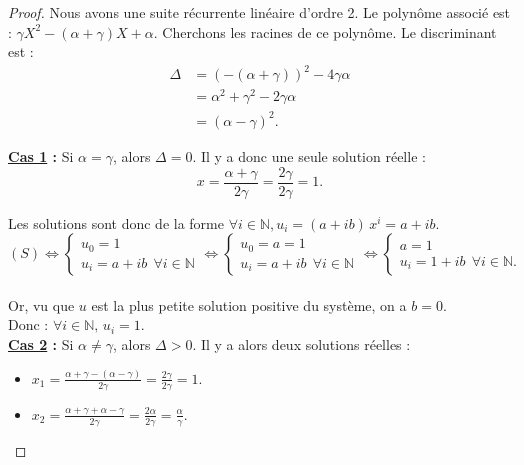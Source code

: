 \documentclass[12pt,a4paper]{report}
\theoremstyle{remark}
\begin{document}
\begin{proof}
\vspace{0.5cm}

Nous avons une suite récurrente linéaire d'ordre 2. Le polynôme associé est  : $\gamma X^2 -(\alpha+\gamma)X+\alpha$. Cherchons les racines de ce polynôme. Le discriminant est :
\begin{align*}
\Delta &= (-(\alpha+\gamma))^2 - 4\gamma \alpha \\
&=\alpha^2 + \gamma^2-2\gamma\alpha \\
&= (\alpha-\gamma)^2.
\end{align*}

\textbf{\underline{Cas 1} :} Si $\alpha = \gamma$, alors $\Delta = 0$. Il y a donc une seule solution réelle :
$$x = \frac{\alpha + \gamma}{2 \gamma}=  \frac{2\gamma}{2\gamma} = 1.$$

Les solutions sont donc de la forme $\forall i \in \mathbb{N}, u_i = (a+ib) \, x^i = a+ib$.\\
$$(S) \iff \left\{
\begin{array}{ll}
        u_0=1\\
        u_i=a+ib \ \ \forall i \in \mathbb{N}
    \end{array}
\right.
\iff \left\{
\begin{array}{ll}
        u_0=a=1\\
        u_i=a+ib \ \ \forall i \in \mathbb{N}
    \end{array}
    \right.
\iff \left\{
\begin{array}{ll}
        a = 1\\
        u_i=1+ib \ \ \forall i \in \mathbb{N}.
    \end{array}
    \right.$$
\\
Or, vu que $u$ est la plus petite solution positive du système, on a $b=0$.\\
Donc : $\forall i \in \mathbb{N}, \, u_i=1.$
\vspace{0.7cm}\\
\textbf{\underline{Cas 2} :} Si $\alpha \neq \gamma$, alors $\Delta > 0$. Il y a alors deux solutions réelles :
\\
\begin{itemize}
\item $x_1 = \frac{\alpha + \gamma - (\alpha-\gamma)}{2\gamma}=\frac{2\gamma}{2\gamma}=1.$
\item $x_2= \frac{\alpha + \gamma + \alpha-\gamma}{2\gamma}=\frac{2\alpha}{2\gamma}=\frac{\alpha}{\gamma}.$
\end{itemize}
\vspace{0.5cm}

\end{proof}
\end{document}
